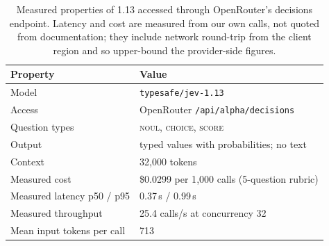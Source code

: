 \begin{table}[t]\centering\small
\caption{Measured properties of \jev{} 1.13 accessed through OpenRouter's
decisions endpoint. Latency and cost are measured from our own calls, not quoted
from documentation; they include network round-trip from the client region and
so upper-bound the provider-side figures.}
\label{tab:jevprops}
\begin{tabular}{ll}
\toprule
Property & Value \\
\midrule
Model & \texttt{typesafe/jev-1.13} \\
Access & OpenRouter \texttt{/api/alpha/decisions} \\
Question types & \textsc{noul}, \textsc{choice}, \textsc{score} \\
Output & typed values with probabilities; no text \\
Context & 32{,}000 tokens \\
Measured cost & \$0.0299 per 1{,}000 calls (5-question rubric) \\
Measured latency p50 / p95 & 0.37\,s / 0.99\,s \\
Measured throughput & 25.4 calls/s at concurrency 32 \\
Mean input tokens per call & 713 \\
\bottomrule
\end{tabular}
\end{table}
